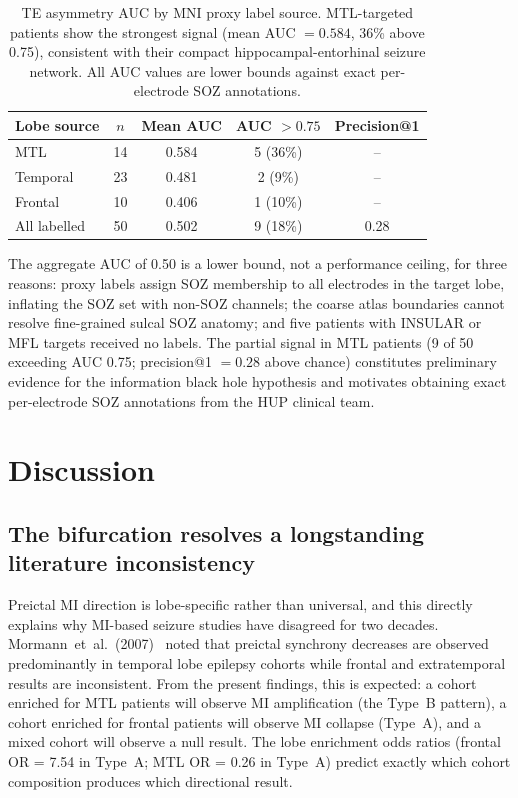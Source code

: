 \documentclass[a4paper,fleqn]{cas-dc}
\begin{document}
\begin{table}[t]
\caption{TE asymmetry AUC by MNI proxy label source. MTL-targeted
  patients show the strongest signal (mean AUC $= 0.584$, 36\% above
  0.75), consistent with their compact hippocampal-entorhinal seizure
  network. All AUC values are lower bounds against exact per-electrode
  SOZ annotations.}
\label{tab:phase4}
\begin{tabular*}{\textwidth}{@{\extracolsep{\fill}}lcccc@{}}
  \toprule
  Lobe source & $n$ & Mean AUC & AUC $> 0.75$ & Precision@1 \\
  \midrule
  MTL          & 14 & 0.584 & 5 (36\%) & {--} \\
  Temporal     & 23 & 0.481 & 2 (9\%)  & {--} \\
  Frontal      & 10 & 0.406 & 1 (10\%) & {--} \\
  All labelled & 50 & 0.502 & 9 (18\%) & 0.28 \\
  \bottomrule
\end{tabular*}
\end{table}

The aggregate AUC of 0.50 is a lower bound, not a performance ceiling,
for three reasons: proxy labels assign SOZ membership to all electrodes
in the target lobe, inflating the SOZ set with non-SOZ channels; the
coarse atlas boundaries cannot resolve fine-grained sulcal SOZ anatomy;
and five patients with INSULAR or MFL targets received no labels.
%
The partial signal in MTL patients (9 of 50 exceeding AUC 0.75;
precision@1 $= 0.28$ above chance) constitutes preliminary evidence for
the information black hole hypothesis and motivates obtaining exact
per-electrode SOZ annotations from the HUP clinical team.

\section{Discussion}
\label{sec:discussion}

\subsection{The bifurcation resolves a longstanding literature inconsistency}

Preictal MI direction is lobe-specific rather than universal, and this
directly explains why MI-based seizure studies have disagreed for two
decades.
%
Mormann~et~al.\ (2007)~\citep{mormann2007} noted that preictal synchrony
decreases are observed predominantly in temporal lobe epilepsy cohorts
while frontal and extratemporal results are inconsistent.
%
From the present findings, this is expected: a cohort enriched for MTL
patients will observe MI amplification (the Type~B pattern), a cohort
enriched for frontal patients will observe MI collapse (Type~A), and a
mixed cohort will observe a null result.
%
The lobe enrichment odds ratios (frontal OR = 7.54 in Type~A; MTL
OR = 0.26 in Type~A) predict exactly which cohort composition produces
which directional result.
\end{document}
